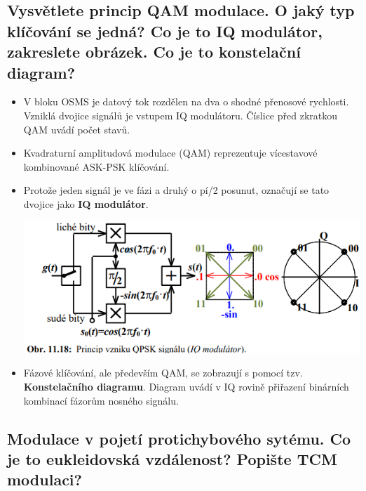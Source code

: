 \subsection{Vysvětlete princip QAM modulace. O jaký typ klíčování se jedná? Co je to IQ modulátor, zakreslete obrázek. Co je to konstelační diagram? }
\begin{itemize}
    \item V bloku OSMS je datový tok rozdělen na dva o shodné přenosové rychlosti.  Vzniklá dvojice signálů je vstupem IQ modulátoru. Číslice před zkratkou QAM uvádí počet stavů.
    \item Kvadraturní amplitudová modulace (QAM) reprezentuje vícestavové kombinované ASK-PSK klíčování.
    \item Protože jeden signál je ve fázi a druhý o pí/2 posunut, označují se tato dvojice jako \textbf{IQ modulátor}.
    
    \includegraphics[]{images/image1.png}
    
    \item Fázové klíčování, ale především QAM, se zobrazují s pomocí tzv. \textbf{Konstelačního diagramu}. Diagram uvádí v IQ rovině přiřazení binárních kombinací fázorům nosného signálu.
\end{itemize}

\subsection{Modulace v pojetí protichybového sytému. Co je to eukleidovská vzdálenost? Popište
TCM modulaci?}

